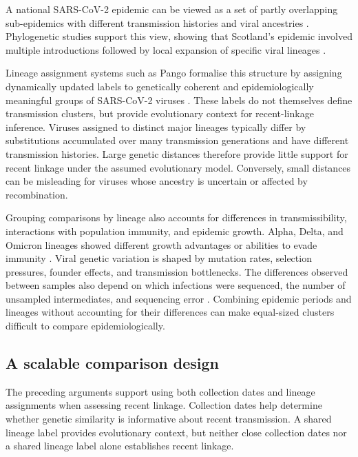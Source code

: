 A national SARS-CoV-2 epidemic can be viewed as a set of partly overlapping sub-epidemics with different transmission histories and viral ancestries \citep{Chowell2019,Vohringer2021}. Phylogenetic studies support this view, showing that Scotland's epidemic involved multiple introductions followed by local expansion of specific viral lineages \citep{daSilvaFilipe2020,duPlessis2021,Lycett2021}.

Lineage assignment systems such as Pango formalise this structure by assigning dynamically updated labels to genetically coherent and epidemiologically meaningful groups of SARS-CoV-2 viruses \citep{Rambaut2020,OToole2021}. These labels do not themselves define transmission clusters, but provide evolutionary context for recent-linkage inference. Viruses assigned to distinct major lineages typically differ by substitutions accumulated over many transmission generations and have different transmission histories. Large genetic distances therefore provide little support for recent linkage under the assumed evolutionary model. Conversely, small distances can be misleading for viruses whose ancestry is uncertain or affected by recombination.

Grouping comparisons by lineage also accounts for differences in transmissibility, interactions with population immunity, and epidemic growth. Alpha, Delta, and Omicron lineages showed different growth advantages or abilities to evade immunity \citep{Volz2021,Davies2021,Mlcochova2021,Viana2022,Cao2021}. Viral genetic variation is shaped by mutation rates, selection pressures, founder effects, and transmission bottlenecks. The differences observed between samples also depend on which infections were sequenced, the number of unsampled intermediates, and sequencing error \citep{Duchene2020,Ghafari2022,Pybus2013}. Combining epidemic periods and lineages without accounting for their differences can make equal-sized clusters difficult to compare epidemiologically.

\subsection{A scalable comparison design}\label{sec:ch2_scalable_design}

The preceding arguments support using both collection dates and lineage assignments when assessing recent linkage. Collection dates help determine whether genetic similarity is informative about recent transmission. A shared lineage label provides evolutionary context, but neither close collection dates nor a shared lineage label alone establishes recent linkage.

